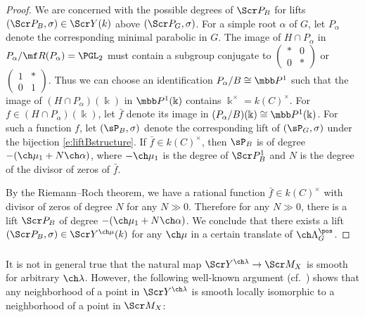 \begin{proof}
We are concerned with the possible degrees of $\Scr P_B$ for
lifts $(\Scr P_B,\sigma)\in \Scr Y(k)$ above $(\Scr P_G,\sigma)$.
For a simple root $\alpha$ of $G$, let $P_\alpha$ denote the corresponding minimal
parabolic in $G$.
The image of $H\cap P_\alpha$ in $P_\alpha/\mf R(P_\alpha) = \PGL_2$ must contain
a subgroup conjugate to $\left(\begin{smallmatrix} * & 0 \\ 0 & * \end{smallmatrix}\right)$
or $\left(\begin{smallmatrix} 1 & * \\ 0 & 1 \end{smallmatrix}\right)$.
Thus we can choose an identification $P_\alpha/B \cong \mbb P^1$ such that
the image of $(H\cap P_\alpha)(\Bbbk)$ in $\mbb P^1(\Bbbk)$ contains
$\Bbbk^\times = k(C)^\times$.
For $f \in (H\cap P_\alpha)(\Bbbk)$, let $\bar f$ denote its image in $(P_\alpha/B)(\Bbbk) \cong \mbb P^1(\Bbbk)$.
For such a function $f$, let $(\sP_B,\sigma)$ denote the corresponding lift
of $(\sP_G,\sigma)$ under the bijection \eqref{e:liftBstructure}.
If $\bar f \in k(C)^\times$, then $\sP_B$ is of degree $-(\ch\mu_1 + N\ch\alpha)$,
where $-\ch\mu_1$ is the degree of $\Scr P_B^1$ and
$N$ is the degree of the divisor of zeros of $\bar f$.

By the Riemann--Roch theorem, we have a rational function $\bar f\in k(C)^\times$
with divisor of zeros of degree $N$ for any $N \gg 0$.
Therefore for any $N\gg 0$, there is a lift $\Scr P_B$ of degree
$-(\ch\mu_1+N\ch\alpha)$.
We conclude that there exists a lift
$(\Scr P_B,\sigma)\in \Scr Y^{\ch\mu}(k)$ for any $\ch\mu$
in a certain translate of $\ch\Lambda^\pos_G$.
\end{proof}


\subsubsection{} \label{sect:locglobyoga}
It is not in general true that the natural map
$\Scr Y^{\ch\lambda} \to \Scr M_{X}$ is smooth for
arbitrary $\ch\lambda$. However, the following
well-known argument (cf.~\cite[Theorem 16.2.1]{GN})
shows that any neighborhood of a point in $\Scr Y^{\ch\lambda}$
is smooth locally isomorphic to a neighborhood of a point in
$\Scr M_{X}$:

